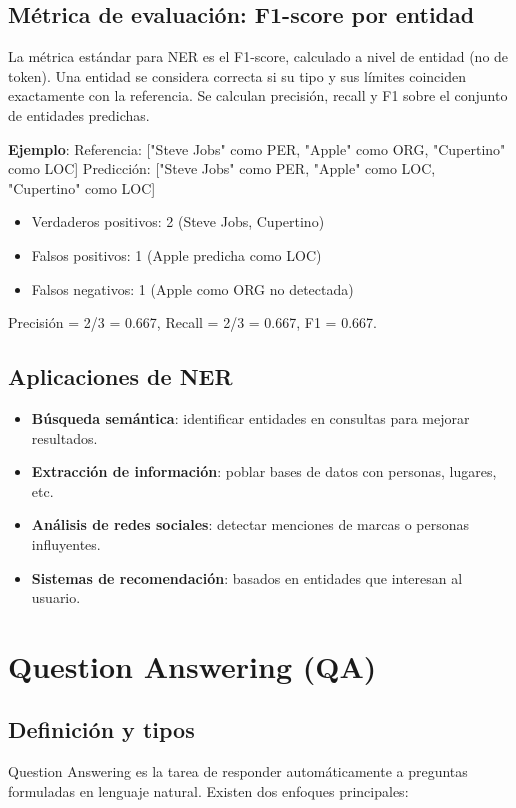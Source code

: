 \documentclass[12pt,a4paper,openany,oneside]{book}
\begin{document}
\subsection{Métrica de evaluación: F1-score por entidad}
La métrica estándar para NER es el F1-score, calculado a nivel de entidad (no de token). Una entidad se considera correcta si su tipo y sus límites coinciden exactamente con la referencia. Se calculan precisión, recall y F1 sobre el conjunto de entidades predichas.

\textbf{Ejemplo}:
Referencia: ["Steve Jobs" como PER, "Apple" como ORG, "Cupertino" como LOC]
Predicción: ["Steve Jobs" como PER, "Apple" como LOC, "Cupertino" como LOC]
\begin{itemize}
    \item Verdaderos positivos: 2 (Steve Jobs, Cupertino)
    \item Falsos positivos: 1 (Apple predicha como LOC)
    \item Falsos negativos: 1 (Apple como ORG no detectada)
\end{itemize}
Precisión = 2/3 = 0.667, Recall = 2/3 = 0.667, F1 = 0.667.

\subsection{Aplicaciones de NER}
\begin{itemize}
    \item \textbf{Búsqueda semántica}: identificar entidades en consultas para mejorar resultados.
    \item \textbf{Extracción de información}: poblar bases de datos con personas, lugares, etc.
    \item \textbf{Análisis de redes sociales}: detectar menciones de marcas o personas influyentes.
    \item \textbf{Sistemas de recomendación}: basados en entidades que interesan al usuario.
\end{itemize}

\section{Question Answering (QA)}

\subsection{Definición y tipos}
Question Answering es la tarea de responder automáticamente a preguntas formuladas en lenguaje natural. Existen dos enfoques principales:
\end{document}
